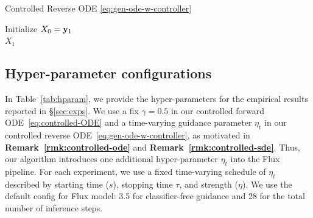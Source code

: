 \documentclass{article} %
\theoremstyle{plain}
\begin{document}
\begin{algorithm}[!t]
    \caption{Controlled Reverse ODE \eqref{eq:gen-ode-w-controller}}
    \label{alg:controlled-rev-ode}
        Initialize $X_0  = {\mathbf{y}}_1$\\
        \Return $X_1$
\end{algorithm}





\subsection{Hyper-parameter configurations}
\label{sec:hparam-config}
In Table~\ref{tab:hparam}, we provide the hyper-parameters for the empirical results reported in \S\ref{sec:exps}. 
We use a fix $\gamma=0.5$ in our controlled forward ODE~\eqref{eq:controlled-ODE} and a time-varying guidance parameter $\eta_t$ in our controlled reverse ODE~\eqref{eq:gen-ode-w-controller}, as motivated in \textbf{Remark~\ref{rmk:controlled-ode}} and \textbf{Remark~\ref{rmk:controlled-sde}}.
Thus, our algorithm introduces one additional hyper-parameter $\eta_t$ into the Flux pipeline. 
For each experiment, we use a fixed time-varying schedule of $\eta_t$ described by starting time ($s$), stopping time $\tau$, and strength ($\eta$). 
We use the default config for Flux model: 3.5 for classifier-free guidance and 28 for the total number of inference steps.
\end{document}
